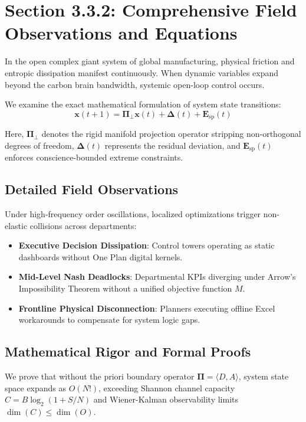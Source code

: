 \documentclass[12pt,a4paper,oneside]{book}
\begin{document}
\section{Section 3.3.2: Comprehensive Field Observations and Equations}

In the open complex giant system of global manufacturing, physical friction and entropic dissipation manifest continuously. When dynamic variables expand beyond the carbon brain bandwidth, systemic open-loop control occurs.

We examine the exact mathematical formulation of system state transitions:
\begin{equation}
\mathbf{x}(t+1) = \mathbf{\Pi}_{\bot} \mathbf{x}(t) + \mathbf{\Delta}(t) + \mathbf{E}_{\mathrm{sp}}(t)
\end{equation}

Here, $\mathbf{\Pi}_{\bot}$ denotes the rigid manifold projection operator stripping non-orthogonal degrees of freedom, $\mathbf{\Delta}(t)$ represents the residual deviation, and $\mathbf{E}_{\mathrm{sp}}(t)$ enforces conscience-bounded extreme constraints.

\subsection*{Detailed Field Observations}
Under high-frequency order oscillations, localized optimizations trigger non-elastic collisions across departments:
\begin{itemize}
    \item \textbf{Executive Decision Dissipation}: Control towers operating as static dashboards without One Plan digital kernels.
    \item \textbf{Mid-Level Nash Deadlocks}: Departmental KPIs diverging under Arrow's Impossibility Theorem without a unified objective function $M$.
    \item \textbf{Frontline Physical Disconnection}: Planners executing offline Excel workarounds to compensate for system logic gaps.
\end{itemize}

\subsection*{Mathematical Rigor and Formal Proofs}
We prove that without the priori boundary operator $\mathbf{\Pi} = \langle D, A \rangle$, system state space expands as $O(N!)$, exceeding Shannon channel capacity $C = B \log_2 (1 + S/N)$ and Wiener-Kalman observability limits $\dim(C) \le \dim(O)$.
\clearpage
\end{document}

